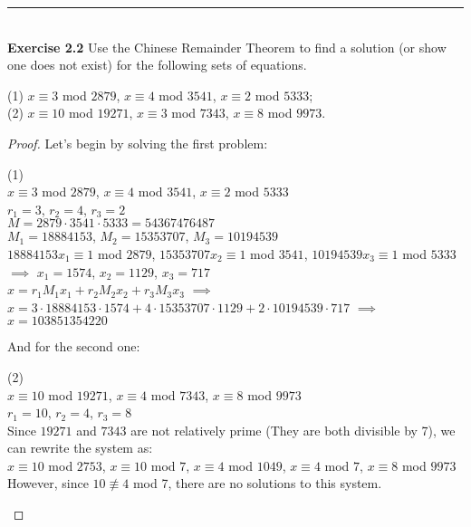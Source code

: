 \documentclass{article}
\begin{document}
\noindent\rule{12cm}{0.4pt}\\
\noindent \textbf{Exercise 2.2} Use the Chinese Remainder Theorem to find a solution (or show one does not exist) for the following sets of equations.
\begin{center}
(1) $x \equiv 3$ mod $2879$, $x \equiv 4$ mod $3541$, $x \equiv 2$ mod $5333$;\\
(2) $x \equiv 10$ mod $19271$, $x \equiv 3$ mod $7343$, $x \equiv 8$ mod $9973$.
\end {center}
\begin{proof}
Let's begin by solving the first problem:
\begin{center}
(1)\\
$x \equiv 3$ mod $2879$, $x \equiv 4$ mod $3541$, $x \equiv 2$ mod $5333$\\
$r_1 = 3$, $r_2 = 4$, $r_3 = 2$\\
$M = 2879 \cdot 3541 \cdot 5333=54367476487$\\
$M_1 = 18884153$, $M_2 = 15353707$, $M_3 = 10194539$\\
$18884153x_1 \equiv 1$ mod $2879$, $15353707x_2 \equiv 1$ mod $3541$, $10194539x_3 \equiv 1$ mod $5333$ $\implies$ $x_1 = 1574$, $x_2 = 1129$, $x_3 = 717$\\
$x = r_{1}M_{1}x_{1} + r_{2}M_{2}x_{2} + r_{3}M_{3}x_{3}$ $\implies$\\
$x = 3 \cdot 18884153 \cdot 1574 + 4 \cdot 15353707 \cdot 1129 + 2 \cdot 10194539 \cdot 717$ $\implies$\\
$x = 103851354220$
\end{center}
And for the second one:
\begin{center}
(2)\\
$x \equiv 10$ mod $19271$, $x \equiv 4$ mod $7343$, $x \equiv 8$ mod $9973$\\
$r_1 = 10$, $r_2 = 4$, $r_3 = 8$\\
Since $19271$ and $7343$ are not relatively prime (They are both divisible by 7), we can rewrite the system as: \\
$x \equiv 10$ mod $2753$, $x \equiv 10$ mod $7$, $x \equiv 4$ mod $1049$, $x \equiv 4$ mod $7$, $x \equiv 8$ mod $9973$\\
However, since $10 \not \equiv 4$ mod 7, there are no solutions to this system.
\end{center}
\end{proof}
\end{document}
